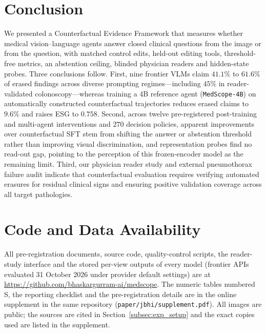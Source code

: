 \documentclass[journal]{IEEEtran}
\begin{document}
\section{Conclusion}
\label{sec:conclusion}
We presented a Counterfactual Evidence Framework that measures whether medical vision--language agents answer closed clinical questions from the image or from the question, with matched control edits, held-out editing tools, threshold-free metrics, an abstention ceiling, blinded physician readers and hidden-state probes. Three conclusions follow. First, nine frontier VLMs claim $41.1\%$ to $61.6\%$ of erased findings across diverse prompting regimes---including $45\%$ in reader-validated colonoscopy---whereas training a 4B reference agent (\texttt{MedScope-4B}) on automatically constructed counterfactual trajectories reduces erased claims to $9.6\%$ and raises ESG to $0.758$. Second, across twelve pre-registered post-training and multi-agent interventions and $270$ decision policies, apparent improvements over counterfactual SFT stem from shifting the answer or abstention threshold rather than improving visual discrimination, and representation probes find no read-out gap, pointing to the perception of this frozen-encoder model as the remaining limit. Third, our physician reader study and external pneumothorax failure audit indicate that counterfactual evaluation requires verifying automated erasures for residual clinical signs and ensuring positive validation coverage across all target pathologies.

\section*{Code and Data Availability}
All pre-registration documents, source code, quality-control scripts, the reader-study interface and the stored per-view outputs of every model (frontier APIs evaluated 31 October 2026 under provider default settings) are at \url{https://github.com/bhaskargurram-ai/medscope}. The numeric tables numbered S, the reporting checklist and the pre-registration details are in the online supplement in the same repository (\texttt{paper/jbhi/supplement.pdf}). All images are public; the sources are cited in Section~\ref{subsec:exp_setup} and the exact copies used are listed in the supplement.




\newpage
\end{document}
